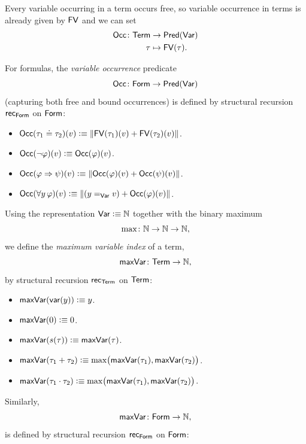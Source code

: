 \begin{defn}\label{defn:fresh}
    Every variable occurring in a term occurs free, so variable occurrence in terms is already given by $\mathsf{FV}$ and we can set
    \begin{align*}
        \fun{Occ}\colon\fun{Term}&\to\fun{Pred}(\fun{Var})\\
        \tau&\mapsto\fun{FV}(\tau).
    \end{align*}
    
    For formulas, the \textsl{variable occurrence} predicate
    \[
        \fun{Occ}\colon\fun{Form}\to\fun{Pred}(\fun{Var})
    \]
    (capturing both free and bound occurrences) is defined by structural recursion $\mathsf{rec}_{\mathsf{Form}}$ on $\mathsf{Form}$:
    \begin{itemize}
        \item $\mathsf{Occ}(\tau_1\doteq\tau_2)(v)\mathrel{\vcentcolon}\equiv\lVert\mathsf{FV}(\tau_1)(v)+\mathsf{FV}(\tau_2)(v)\rVert$.
        \item $\mathsf{Occ}(\neg\varphi)(v)\mathrel{\vcentcolon}\equiv\mathsf{Occ}(\varphi)(v)$.
        \item $\mathsf{Occ}(\varphi\mathrel{\Rightarrow}\psi)(v)\mathrel{\vcentcolon}\equiv\lVert\mathsf{Occ}(\varphi)(v)+\mathsf{Occ}(\psi)(v)\rVert$.
        \item $\mathsf{Occ}(\forall y\,\varphi)(v)\mathrel{\vcentcolon}\equiv\lVert(y\mathrel{=_{\mathsf{Var}}}v)+\mathsf{Occ}(\varphi)(v)\rVert$.
    \end{itemize}
    Using the representation $\mathsf{Var}\mathrel{\vcentcolon}\equiv\mathbb{N}$ together with the binary maximum
    \[
        \max\colon\N\to\N\to\N,
    \]
    we define the \textsl{maximum variable index} of a term, 
    \[
        \fun{maxVar}\colon\fun{Term}\to\N,
    \]
    by structural recursion $\mathsf{rec}_{\mathsf{Term}}$ on $\mathsf{Term}$:
    \begin{itemize}
        \item $\mathsf{maxVar}(\mathsf{var}(y))\mathrel{\vcentcolon}\equiv y$.
        \item $\mathsf{maxVar}(0)\mathrel{\vcentcolon}\equiv 0$.
        \item $\mathsf{maxVar}(s(\tau))\mathrel{\vcentcolon}\equiv\mathsf{maxVar}(\tau)$.
        \item $\mathsf{maxVar}(\tau_1+\tau_2)\mathrel{\vcentcolon}\equiv\max\bigl(\mathsf{maxVar}(\tau_1),\mathsf{maxVar}(\tau_2)\bigr)$.
        \item $\mathsf{maxVar}(\tau_1\cdot\tau_2)\mathrel{\vcentcolon}\equiv\max\bigl(\mathsf{maxVar}(\tau_1),\mathsf{maxVar}(\tau_2)\bigr)$.
    \end{itemize}
    Similarly, 
    \[
        \fun{maxVar}\colon\fun{Form}\to\N,
    \]
    is defined by structural recursion $\mathsf{rec}_{\mathsf{Form}}$ on $\mathsf{Form}$:

\end{defn}
